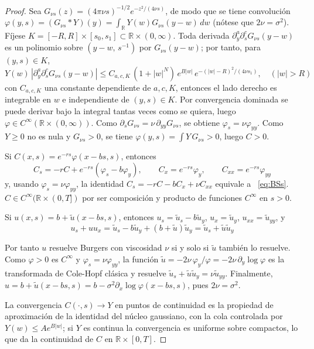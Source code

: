 \documentclass[11pt,letterpaper]{article}
\theoremstyle{plain}
\theoremstyle{definition}
\theoremstyle{remark}
\numberwithin{equation}{section}
\newcommand{\R}{\mathbb{R}}
\begin{document}
	\begin{proof}
		Sea \(G_{\nu s}(z)=(4\pi\nu s)^{-1/2}e^{-z^2/(4\nu s)}\), de modo que se tiene convolución \(\varphi(y,s)=(G_{\nu s}*Y)(y)=\int_{\R} Y(w)G_{\nu s}(y-w)\,dw\) (nótese que \(2\nu=\sigma^2\)). Fíjese \(K=[-R,R]\times[s_0,s_1]\subset\R\times(0,\infty)\). Toda derivada \(\partial_y^a\partial_s^c G_{\nu s}(y-w)\) es un polinomio sobre \((y-w,\,s^{-1})\) por \(G_{\nu s}(y-w)\); por tanto, para \((y,s)\in K\),
		\[
		Y(w)\,\left|\partial_y^a\partial_s^c G_{\nu s}(y-w)\right|
		\le C_{a,c,K}\,(1+|w|^{N})\,e^{B|w|}\,e^{-(|w|-R)^2/(4\nu s_1)}, \quad(|w|>R)
		\]
		con \(C_{a,c,K}\) una constante dependiente de \(a,c,K\), entonces el lado derecho es integrable en \(w\) e independiente de \((y,s)\in K\). Por convergencia dominada se puede derivar bajo la integral tantas veces como se quiera, luego \(\varphi\in C^\infty(\R\times(0,\infty))\). Como \(\partial_sG_{\nu s}=\nu\,\partial_{yy}G_{\nu s}\), se obtiene \(\varphi_s=\nu\varphi_{yy}\). Como \(Y\ge0\) no es nula y \(G_{\nu s}>0\), se tiene \(\varphi(y,s)=\int Y\,G_{\nu s}>0\), luego \(C>0\).
		
		Si \(C(x,s)=e^{-rs}\varphi(x-bs,s)\), entonces
		\[
		C_s=-rC+e^{-rs}(\varphi_s-b\varphi_y),\qquad C_x=e^{-rs}\varphi_y,\qquad C_{xx}=e^{-rs}\varphi_{yy}
		\]
		y, usando \(\varphi_s=\nu\varphi_{yy}\), la identidad \(C_s=-rC-bC_x+\nu C_{xx}\) equivale a ~\eqref{eq:BSs}. \(C\in C^\infty(\R\times(0,T])\) por ser composición y producto de funciones \(C^\infty\) en \(s>0\).
		
		Si \(u(x,s)=b+\tilde u(x-bs,s)\), entonces \(u_s=\tilde u_s-b\tilde u_y\), \(u_x=\tilde u_y\), \(u_{xx}=\tilde u_{yy}\), y
		\[
		u_s+uu_x=\tilde u_s-b\tilde u_y+(b+\tilde u)\tilde u_y=\tilde u_s+\tilde u\tilde u_y
		\]
		
		Por tanto \(u\) resuelve Burgers con viscosidad \(\nu\) si y solo si \(\tilde u\) también lo resuelve. Como \(\varphi>0\) es \(C^\infty\) y \(\varphi_s=\nu\varphi_{yy}\), la función \(\tilde u=-2\nu\,\varphi_y/\varphi=-2\nu\,\partial_y\log\varphi\) es la transformada de Cole-Hopf clásica y resuelve \(\tilde u_s+\tilde u\tilde u_y=\nu\tilde u_{yy}\). Finalmente, \(u=b+\tilde u(x-bs,s)=b-\sigma^2\partial_x\log\varphi(x-bs,s)\), pues \(2\nu=\sigma^2\).
		
		La convergencia \(C(\cdot,s)\to Y\) en puntos de continuidad es la propiedad de aproximación de la identidad del núcleo gaussiano, con la cola controlada por \(Y(w)\le Ae^{B|w|}\); si \(Y\) es continua la convergencia es uniforme sobre compactos, lo que da la continuidad de \(C\) en \(\R\times[0,T]\).
		
	\end{proof}
	
\end{document}
